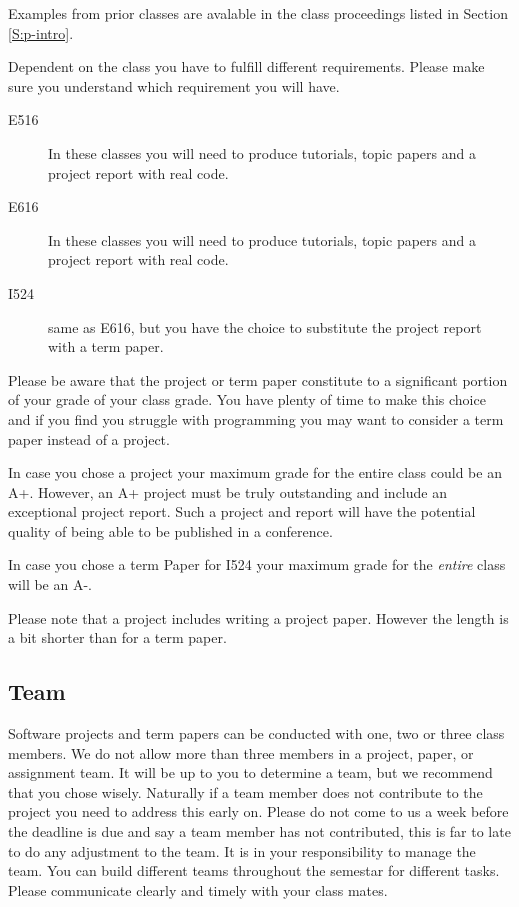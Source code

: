 Examples from prior classes are avalable in the class proceedings
listed in Section \ref{S:p-intro}.

Dependent on the class you have to fulfill different
requirements. Please make sure you understand which requirement you
will have.

\begin{description}

\item[E516] In these classes you will need to produce
  tutorials, topic papers and a project report with real code.

\item[E616] In these classes you will need to produce
  tutorials, topic papers and a project report with real code. 

\item[I524] same as E616, but you have the choice to
  substitute the project report with a term paper.

\end{description}

Please be aware that the project or term paper constitute to a
significant portion of your grade of your class grade. You have plenty
of time to make this choice and if you find you struggle with
programming you may want to consider a term paper instead of a
project.

In case you chose a project your maximum grade for the entire class
could be an A+. However, an A+ project must be truly outstanding and
include an exceptional project report. Such a project and report will
have the potential quality of being able to be published in a
conference.

In case you chose a term Paper for I524 your maximum grade for the
{\em entire} class will be an A-.

Please note that a project includes writing a project paper.  However
the length is a bit shorter than for a term paper.

\subsection{Team}

Software projects and term papers can be conducted with one, two or
three class members. We do not allow more than three members in a
project, paper, or assignment team. It will be up to you to determine
a team, but we recommend that you chose wisely. Naturally if a team
member does not contribute to the project you need to address this
early on. Please do not come to us a week before the deadline is due
and say a team member has not contributed, this is far to late to do
any adjustment to the team. It is in your responsibility to manage the
team. You can build different teams throughout the semestar for
different tasks. Please communicate clearly and timely with your
class mates.

